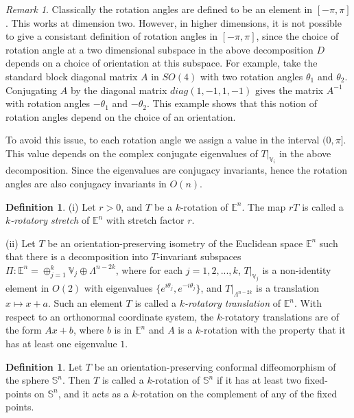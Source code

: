 \documentclass[11pt]{amsart}
\theoremstyle{definition}
\newtheorem{definition}[theorem]{Definition}
\theoremstyle{remark}
\newtheorem{remark}[theorem]{Remark}
\numberwithin{equation}{section}
\theoremstyle{plain}
\begin{document}
\begin{remark}
Classically the rotation angles are defined to be an element in $[-\pi, \pi]$. This works at dimension two. However, in higher dimensions, it is not possible to give a consistant definition of rotation angles in $[-\pi, \pi]$, since the choice of rotation angle at a two dimensional subspace in the above decomposition $D$ depends on a choice of orientation at this subspace. For example, 
take the standard block diagonal matrix $A$ in $SO(4)$ with two rotation angles
$\theta_1$ and $\theta_2$. Conjugating $A$ by the diagonal matrix ${diag}(1,-1,1,-1)$
gives the matrix $A^{-1}$ with rotation angles $-\theta_1$ and $-\theta_2$.  
This example shows that this notion of rotation angles depend on the choice of an orientation. 

To avoid this issue, to each rotation angle we assign a value in the interval $(0, \pi]$. This value depends on the complex conjugate eigenvalues of $T|_{{\mathbb V}_i}$ in the above decomposition. Since the eigenvalues are conjugacy invariants, hence the rotation angles are also conjugacy invariants in $O(n)$. 
\end{remark}

\begin{definition}
(i) Let $r>0$, and $T$ be a $k$-rotation of ${\mathbb E}^n$. The map $rT$ is called a \emph{$k$-rotatory stretch} of ${\mathbb E}^n$ with stretch factor $r$. 

(ii) Let $T$ be an orientation-preserving isometry of the Euclidean space ${\mathbb E}^n$ such that there is a decomposition into $T$-invariant subspaces $\Pi: {\mathbb E}^n=\oplus_{j=1}^k {\mathbb V}_j \oplus \Lambda^{n-2k}$, where for each $j=1,2,...,k$, $T|_{{\mathbb V}_j}$ is a non-identity element in $O(2)$ with eigenvalues $\{ e^{i \theta_j}, e^{-i \theta_j} \}$, and $T|_{\Lambda^{n-2k}}$ is a translation $x \mapsto x+a$. Such an element $T$ is called a \emph{$k$-rotatory translation} of ${\mathbb E}^n$. With respect to an orthonormal  coordinate system, 
the $k$-rotatory translations are of the form $Ax +b$, where $b$ is in ${\mathbb E}^n$ and $A$ is a $k$-rotation with the property that it has at least one eigenvalue $1$. 
\end{definition}

\begin{definition}
Let $T$ be an orientation-preserving conformal diffeomorphism of the sphere ${\mathbb S}^n$. Then $T$ is called a $k$-rotation of ${\mathbb S}^n$ if it has at least two fixed-points on ${\mathbb S}^n$, and it acts as a $k$-rotation on the complement of any of the fixed points. 
\end{definition}
\end{document}

